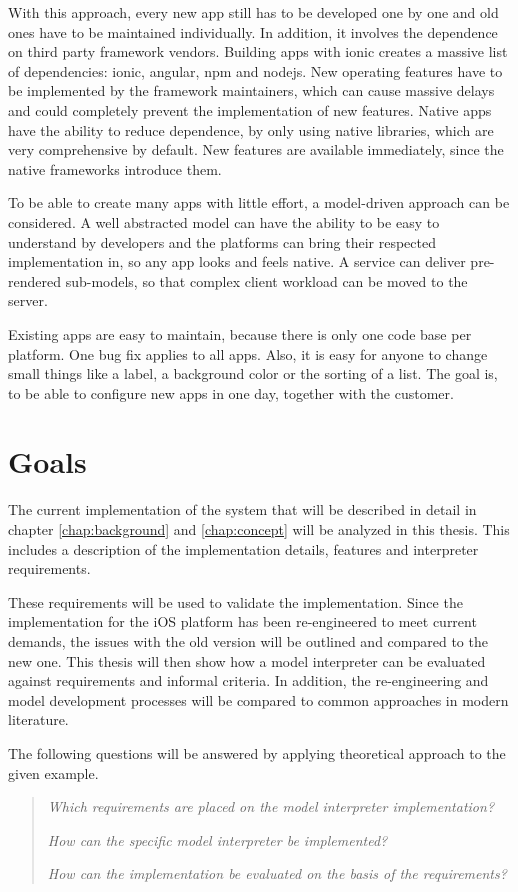 With this approach, every new app still has to be developed one by one and old ones have to be maintained individually.
In addition, it involves the dependence on third party framework vendors. 
Building apps with ionic creates a massive list of dependencies: ionic, angular, npm and nodejs.
New operating features have to be implemented by the framework maintainers, which can cause massive delays and could completely prevent the implementation of new features.
Native apps have the ability to reduce dependence, by only using native libraries, which are very comprehensive by default.
New features are available immediately, since the native frameworks introduce them.

To be able to create many apps with little effort, a model-driven approach can be considered.
A well abstracted model can have the ability to be easy to understand by developers and the platforms can bring their respected implementation in, so any app looks and feels native.
A service can deliver pre-rendered sub-models, so that complex client workload can be moved to the server.

Existing apps are easy to maintain, because there is only one code base per platform.
One bug fix applies to all apps.
Also, it is easy for anyone to change small things like a label, a background color or the sorting of a list.
The goal is, to be able to configure new apps in one day, together with the customer.



\section{Goals}
\label{sec:goals}

The current implementation of the system that will be described in detail in chapter \ref{chap:background} and \ref{chap:concept} will be analyzed in this thesis.
This includes a description of the implementation details, features and interpreter requirements.

These requirements will be used to validate the implementation.
Since the implementation for the iOS platform has been re-engineered to meet current demands, the issues with the old version will be outlined and compared to the new one.
This thesis will then show how a model interpreter can be evaluated against requirements and informal criteria.
In addition, the re-engineering and model development processes will be compared to common approaches in modern literature.

The following questions will be answered by applying theoretical approach to the given example.
\begin{quote}
	\textit{Which requirements are placed on the model interpreter implementation?}
	
	\textit{How can the specific model interpreter be implemented?}
	
	\textit{How can the implementation be evaluated on the basis of the requirements?}
\end{quote}



